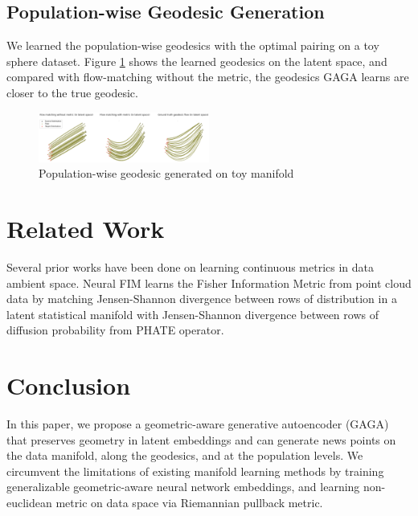 \documentclass{article}
\theoremstyle{plain}
\theoremstyle{definition}
\theoremstyle{remark}
\newcommand{\methodshort}{GAGA\xspace}
\begin{document}
\subsection{Population-wise Geodesic Generation}
\par We learned the population-wise geodesics with the optimal pairing on a toy sphere dataset. Figure \ref{fig:latent_only_2} shows the learned geodesics on the latent space, and compared with flow-matching without the metric, the geodesics \methodshort learns are closer to the true geodesic.
\begin{figure}[htbp]
    \centering
    \includegraphics[width=0.5\textwidth]{fig/latent_only_2.png}
    \caption{Population-wise geodesic generated on toy manifold}
    \label{fig:latent_only_2}
\end{figure}

\section{Related Work}
\par Several prior works have been done on learning continuous metrics in data ambient space. Neural FIM \cite{fasina2023neural} learns the Fisher Information Metric from point cloud data by matching Jensen-Shannon divergence between rows of distribution in a latent statistical manifold with Jensen-Shannon divergence between rows of diffusion probability from PHATE operator. 


\section{Conclusion}
\par In this paper, we propose a geometric-aware generative autoencoder (GAGA) that preserves geometry in latent embeddings and can generate news points on the data manifold, along the geodesics, and at the population levels. We circumvent the limitations of existing manifold learning methods by training generalizable geometric-aware neural network embeddings, and learning non-euclidean metric on data space via Riemannian pullback metric.


%

\end{document}
